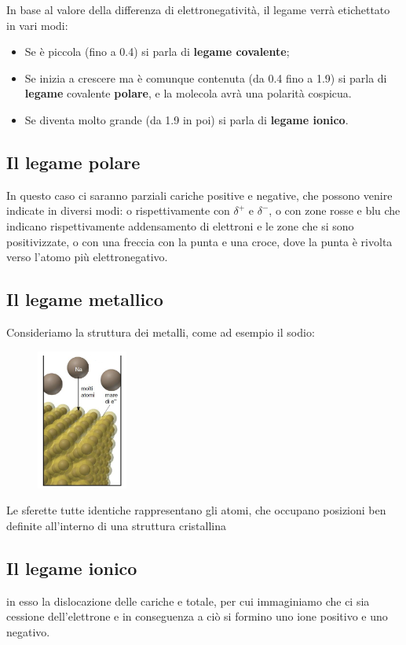 In base al valore della differenza di elettronegatività, il legame verrà etichettato in vari modi:
\begin{itemize}
    \item Se è piccola (fino a 0.4) si parla di \textbf{legame covalente};
    \item Se inizia a crescere ma è comunque contenuta (da 0.4 fino a 1.9) si parla di \textbf{legame} covalente \textbf{polare}, e la molecola avrà una polarità cospicua. 
    \item Se diventa molto grande (da 1.9 in poi) si parla di \textbf{legame ionico}.
\end{itemize} 
\subsection{Il legame polare}
In questo caso ci saranno parziali cariche positive e negative, che possono venire indicate in diversi modi: o rispettivamente con $\delta^+$ e $\delta^-$, o con zone rosse e blu che indicano rispettivamente addensamento di elettroni e le zone che si sono positivizzate, o con una freccia con la punta e una croce, dove la punta è rivolta verso l'atomo più elettronegativo.
\subsection{Il legame metallico}
Consideriamo la struttura dei metalli, come ad esempio il sodio:
\begin{figure}[htp]
    \centering
    \includegraphics[width=3cm]{immagini/legame-metallico.png}
\end{figure}
Le sferette tutte identiche rappresentano gli atomi, che occupano posizioni ben definite all'interno di una struttura cristallina 
\subsection{Il legame ionico}
in esso la dislocazione delle cariche e totale, per cui immaginiamo che ci sia cessione dell'elettrone e in conseguenza a ciò si formino uno ione positivo e uno negativo.
